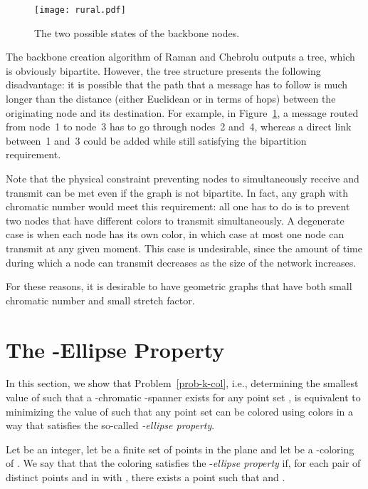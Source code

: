\documentclass[pdftex,leqno,fleqn,12pts]{llncs}
\begin{document}
\begin{figure}
 \centering\texttt{[image: rural.pdf]} 
 \caption{The two possible states of the backbone nodes.}
 \label{fig-rural}
\end{figure}

The backbone creation algorithm of Raman and Chebrolu \cite{raman05}
outputs a tree, which is obviously bipartite. However, the
tree structure presents the following disadvantage: it is possible
that the path that a message has to follow is much longer than the
distance (either Euclidean or in terms of hops) between the
originating node and its destination. For example, in
Figure~\ref{fig-rural}, a message routed from node~1 to node~3 has
to go through nodes~2 and~4, whereas a direct link between~1 and~3
could be added while still satisfying the bipartition requirement.

Note that the physical constraint preventing nodes to simultaneously
receive and transmit can be met even if the graph is not bipartite.
In fact, any graph with chromatic number  would meet this
requirement: all one has to do is to prevent two nodes that have
different colors to transmit simultaneously. A degenerate case is
when each node has its own color, in which case at most one node can
transmit at any given moment. This case is undesirable, since the
amount of time during which a node can transmit decreases as the
size of the network increases.

For these reasons, it is desirable to have geometric graphs that
have both small chromatic number and small stretch factor. 


\section{The -Ellipse Property}\label{section-ellipse}
In this section, we show that Problem~\ref{prob-k-col}, i.e., 
determining the smallest value of  such that a -chromatic 
-spanner exists for any point set , is equivalent to minimizing 
the value of  such that any point set can be colored using  
colors in a way that satisfies the so-called \emph{-ellipse property}. 

\begin{definition} 
Let  be an integer, let  be a finite set of points in the 
plane and let  be a -coloring of 
. We say that that the coloring  satisfies the 
-\emph{ellipse property} if, for each pair of distinct points
 and  in  with , there exists a point 
such that  and .
\end{definition}
\end{document}

